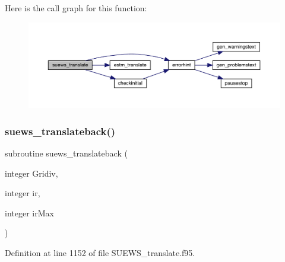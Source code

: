 Here is the call graph for this function\+:\nopagebreak
\begin{figure}[H]
\begin{center}
\leavevmode
\includegraphics[width=350pt]{_s_u_e_w_s__translate_8f95_abf8ea565715e31244a76de2908c9fc4b_cgraph}
\end{center}
\end{figure}
\mbox{\label{_s_u_e_w_s__translate_8f95_a5c6d5265e5c9daebbaaff8999791406e}} 
\subsubsection{\texorpdfstring{suews\+\_\+translateback()}{suews\_translateback()}}
{\footnotesize\ttfamily subroutine suews\+\_\+translateback (\begin{DoxyParamCaption}\item[{integer}]{Gridiv,  }\item[{integer}]{ir,  }\item[{integer}]{ir\+Max }\end{DoxyParamCaption})}



Definition at line 1152 of file S\+U\+E\+W\+S\+\_\+translate.\+f95.

